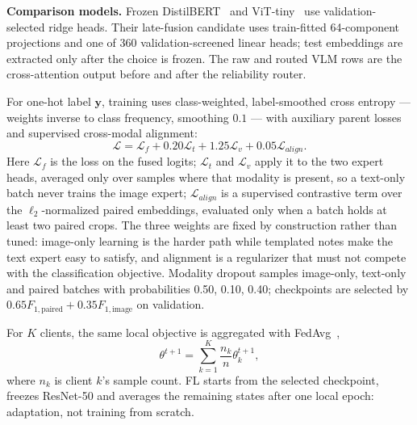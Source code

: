 \documentclass[conference]{IEEEtran}
\begin{document}
\textbf{Comparison models.} Frozen DistilBERT~\cite{Sanh2019} and
ViT-tiny~\cite{Dosovitskiy2021} use validation-selected ridge heads. Their
late-fusion candidate uses train-fitted 64-component projections and one of 360
validation-screened linear heads; test embeddings are extracted only after the
choice is frozen. The raw and routed VLM rows are the cross-attention output
before and after the reliability router.

For one-hot label $\mathbf{y}$, training uses class-weighted, label-smoothed
cross entropy --- weights inverse to class frequency, smoothing $0.1$ --- with
auxiliary parent losses and supervised cross-modal alignment:
\begin{equation}
\mathcal{L}=\mathcal{L}_{f}
 +0.20\mathcal{L}_{t}
 +1.25\mathcal{L}_{v}
 +0.05\mathcal{L}_{align}.
\label{eq:loss}
\end{equation}
Here $\mathcal{L}_{f}$ is the loss on the fused logits; $\mathcal{L}_{t}$ and
$\mathcal{L}_{v}$ apply it to the two expert heads, averaged only over samples
where that modality is present, so a text-only batch never trains the image
expert; $\mathcal{L}_{align}$ is a supervised contrastive term over the
$\ell_2$-normalized paired embeddings, evaluated only when a batch holds at
least two paired crops. The
three weights are fixed by construction rather than tuned: image-only learning
is the harder path while templated notes make the text expert easy to satisfy,
and alignment is a regularizer that must not compete with the classification
objective. Modality dropout samples image-only, text-only and paired batches with
probabilities 0.50, 0.10, 0.40; checkpoints are selected by
$0.65F_{1,\mathrm{paired}}+0.35F_{1,\mathrm{image}}$ on validation.

For $K$ clients, the same local objective is aggregated with
FedAvg~\cite{McMahan2017},
\begin{equation}
\theta^{t+1}=\sum_{k=1}^{K}\frac{n_k}{n}\theta_k^{t+1},
\label{eq:fedobj}
\end{equation}
where $n_k$ is client $k$'s sample count. FL starts from the selected
checkpoint, freezes ResNet-50 and averages the remaining states after one
local epoch: adaptation, not training from scratch.
\end{document}
